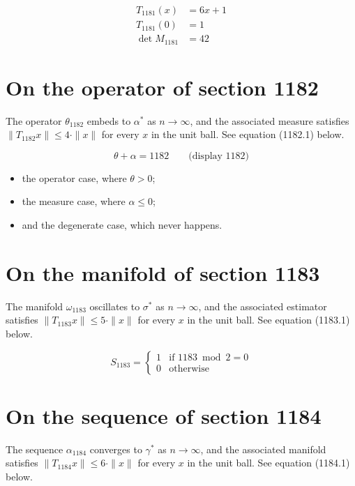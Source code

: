 \documentclass{article}
\begin{document}
\begin{align}
T_{1181}(x) &= 6 x + 1 \\
T_{1181}(0) &= 1 \\
\det M_{1181} &= 42
\end{align}

\section{On the operator of section 1182}
The operator $\theta_{1182}$ embeds to $\alpha^{*}$ as $n \to \infty$,
and the associated measure satisfies $\|T_{1182} x\| \leq 4 \cdot \|x\|$
for every $x$ in the unit ball. See equation (1182.1) below.

$$
\theta + \alpha = 1182 \qquad \text{(display 1182)}
$$

\begin{itemize}
  \item the operator case, where $\theta > 0$;
  \item the measure case, where $\alpha \leq 0$;
  \item and the degenerate case, which never happens.
\end{itemize}

\section{On the manifold of section 1183}
The manifold $\omega_{1183}$ oscillates to $\sigma^{*}$ as $n \to \infty$,
and the associated estimator satisfies $\|T_{1183} x\| \leq 5 \cdot \|x\|$
for every $x$ in the unit ball. See equation (1183.1) below.

\begin{equation}
S_{1183} = \begin{cases} 1 & \text{if } 1183 \bmod 2 = 0 \\ 0 & \text{otherwise} \end{cases}
\end{equation}

\section{On the sequence of section 1184}
The sequence $\alpha_{1184}$ converges to $\gamma^{*}$ as $n \to \infty$,
and the associated manifold satisfies $\|T_{1184} x\| \leq 6 \cdot \|x\|$
for every $x$ in the unit ball. See equation (1184.1) below.
\end{document}
